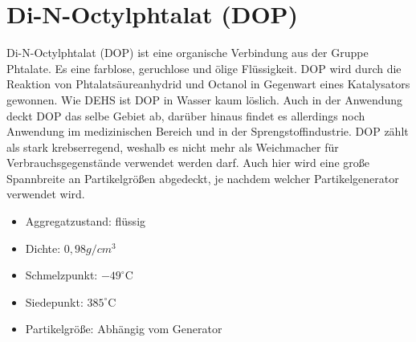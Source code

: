 \section{Di-N-Octylphtalat (DOP)}
Di-N-Octylphtalat (DOP) ist eine organische Verbindung aus der Gruppe Phtalate. Es eine farblose, geruchlose und \"{o}lige Fl\"{u}ssigkeit. DOP wird durch die Reaktion von Phtalats\"{a}ureanhydrid und Octanol in Gegenwart eines Katalysators gewonnen. Wie DEHS ist DOP in Wasser kaum l\"{o}slich. Auch in der Anwendung deckt DOP das selbe Gebiet ab, dar\"{u}ber hinaus findet es allerdings noch Anwendung im medizinischen Bereich und in der Sprengstoffindustrie. DOP z\"{a}hlt als stark krebserregend, weshalb es nicht mehr als Weichmacher f\"{u}r Verbrauchsgegenst\"{a}nde verwendet werden darf. Auch hier wird eine gro{\ss}e Spannbreite an Partikelgr\"{o}{\ss}en abgedeckt, je nachdem welcher Partikelgenerator verwendet wird.
\begin{itemize}
\item Aggregatzustand: fl\"{u}ssig
\item Dichte: \(0,98 g/cm^3\)
\item Schmelzpunkt: \(-49^\circ\text{C}\)
\item Siedepunkt: \(385^\circ\text{C}\)
\item Partikelgr\"{o}{\ss}e: Abh\"{a}ngig vom Generator
\end{itemize}
